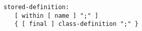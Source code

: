 \begin{lstlisting}[language=grammar]
stored-definition:
   [ within [ name ] ";" ]
   { [ final ] class-definition ";" }
\end{lstlisting}
